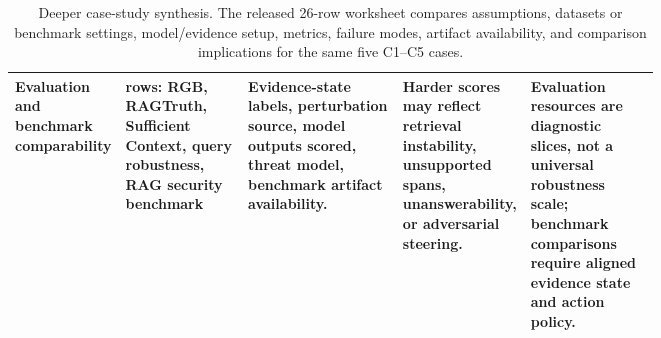\documentclass[11pt]{article}
\begin{document}
\begin{table}[t]
\begin{tabularx}{\linewidth}{>{\raggedright\arraybackslash}p{0.14\linewidth}>{\raggedright\arraybackslash}p{0.19\linewidth}>{\raggedright\arraybackslash}p{0.24\linewidth}>{\raggedright\arraybackslash}p{0.18\linewidth}X}
Evaluation and benchmark comparability & 5 rows: RGB, RAGTruth, Sufficient Context, query robustness, RAG security benchmark & Evidence-state labels, perturbation source, model outputs scored, threat model, benchmark artifact availability. & Harder scores may reflect retrieval instability, unsupported spans, unanswerability, or adversarial steering. & Evaluation resources are diagnostic slices, not a universal robustness scale; benchmark comparisons require aligned evidence state and action policy. \\
\bottomrule
\end{tabularx}
\caption{Deeper case-study synthesis. The released 26-row worksheet compares assumptions, datasets or benchmark settings, model/evidence setup, metrics, failure modes, artifact availability, and comparison implications for the same five C1--C5 cases.}
\label{tab:deep-case-study-matrix}
\end{table}

\end{document}
